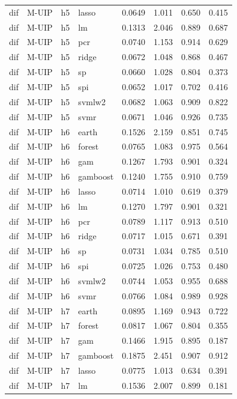 \begin{ThreePartTable}
\begin{longtable}[t]{llclcccc}
dif & M-UIP & h5 & lasso & 0.0649 & 1.011 & 0.650 & 0.415\\
dif & M-UIP & h5 & lm & 0.1313 & 2.046 & 0.889 & 0.687\\
dif & M-UIP & h5 & pcr & 0.0740 & 1.153 & 0.914 & 0.629\\
dif & M-UIP & h5 & ridge & 0.0672 & 1.048 & 0.868 & 0.467\\
dif & M-UIP & h5 & sp & 0.0660 & 1.028 & 0.804 & 0.373\\
dif & M-UIP & h5 & spi & 0.0652 & 1.017 & 0.702 & 0.416\\
dif & M-UIP & h5 & svmlw2 & 0.0682 & 1.063 & 0.909 & 0.822\\
dif & M-UIP & h5 & svmr & 0.0671 & 1.046 & 0.926 & 0.735\\
\addlinespace
dif & M-UIP & h6 & earth & 0.1526 & 2.159 & 0.851 & 0.745\\
dif & M-UIP & h6 & forest & 0.0765 & 1.083 & 0.975 & 0.564\\
dif & M-UIP & h6 & gam & 0.1267 & 1.793 & 0.901 & 0.324\\
dif & M-UIP & h6 & gamboost & 0.1240 & 1.755 & 0.910 & 0.759\\
dif & M-UIP & h6 & lasso & 0.0714 & 1.010 & 0.619 & 0.379\\
dif & M-UIP & h6 & lm & 0.1270 & 1.797 & 0.901 & 0.321\\
dif & M-UIP & h6 & pcr & 0.0789 & 1.117 & 0.913 & 0.510\\
dif & M-UIP & h6 & ridge & 0.0717 & 1.015 & 0.671 & 0.391\\
dif & M-UIP & h6 & sp & 0.0731 & 1.034 & 0.785 & 0.510\\
dif & M-UIP & h6 & spi & 0.0725 & 1.026 & 0.753 & 0.480\\
dif & M-UIP & h6 & svmlw2 & 0.0744 & 1.053 & 0.955 & 0.688\\
dif & M-UIP & h6 & svmr & 0.0766 & 1.084 & 0.989 & 0.928\\
\addlinespace
dif & M-UIP & h7 & earth & 0.0895 & 1.169 & 0.943 & 0.722\\
dif & M-UIP & h7 & forest & 0.0817 & 1.067 & 0.804 & 0.355\\
dif & M-UIP & h7 & gam & 0.1466 & 1.915 & 0.895 & 0.187\\
dif & M-UIP & h7 & gamboost & 0.1875 & 2.451 & 0.907 & 0.912\\
dif & M-UIP & h7 & lasso & 0.0775 & 1.013 & 0.634 & 0.391\\
dif & M-UIP & h7 & lm & 0.1536 & 2.007 & 0.899 & 0.181\\

\end{longtable}
\end{ThreePartTable}

